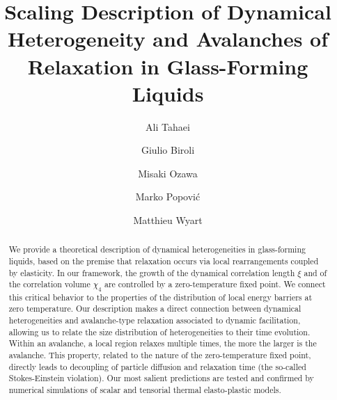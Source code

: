 \documentclass[pre,twocolumn,superscriptaddress,tightenlines,showpacs,longbibliography,floatfix,footinbib]{revtex4-1}
\begin{document}
\title{Scaling Description of Dynamical Heterogeneity and Avalanches of Relaxation in Glass-Forming Liquids }

\author{Ali Tahaei}

\author{Giulio Biroli}

\author{Misaki Ozawa}

\author{Marko Popović}

\author{Matthieu Wyart}




%
\begin{abstract}
We provide a theoretical description of dynamical heterogeneities in glass-forming liquids, based on the premise that relaxation occurs via local rearrangements coupled by elasticity. In our framework, the growth of the dynamical correlation length $\xi$ and of the correlation volume $\chi_4$ are controlled by a zero-temperature fixed point. We connect this critical behavior to the properties of the distribution of local energy barriers at zero temperature. Our description makes a direct connection between dynamical heterogeneities and avalanche-type relaxation associated to dynamic facilitation, allowing us to relate the size distribution of heterogeneities to their time evolution. Within an avalanche, a local region relaxes multiple times, the more the larger is the avalanche. This property, related to the nature of the zero-temperature fixed point, directly leads to decoupling of particle diffusion and relaxation time (the so-called Stokes-Einstein violation).
Our most salient predictions are tested and confirmed by numerical simulations of  scalar and tensorial thermal elasto-plastic models.
\end{abstract}

\maketitle
\end{document}
